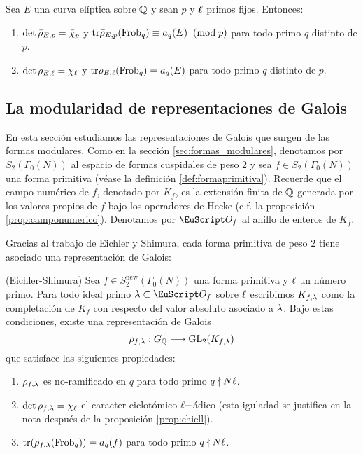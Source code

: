 \documentclass[../../tesis_maestria]{subfiles}
\begin{document}
\begin{cor}\label{cor:det_de_rhop}
  Sea $E$ una curva el\'iptica sobre $\mathbb{Q}$ y sean $p$ y $\ell$ primos fijos. Entonces:
  \begin{enumerate}
  \item $\det\bar{\rho}_{E,p}=\bar{\chi}_p$ y $\mathrm{tr}\bar{\rho}_{E,p}(\mathrm{Frob}_q)\equiv a_q(E)\;\;(\mathrm{mod}\; p)$ para todo primo $q$ distinto de $p$.
    \item $\det\rho_{E,\ell}=\chi_{\ell}$ y $\mathrm{tr}\rho_{E,\ell}(\mathrm{Frob}_q)=a_q(E)$ para todo primo $q$ distinto de $p$.
  \end{enumerate}
\end{cor}

\subsection{La modularidad de representaciones de Galois}%

En esta secci\'on estudiamos las representaciones de Galois que surgen de las formas modulares. Como en la secci\'on \ref{sec:formas_modulares}, denotamos por $S_2(\Gamma_0(N))$ al espacio de formas cuspidales de peso 2 y sea $f\in S_2(\Gamma_0(N))$ una forma primitiva (v\'ease la definici\'on \ref{def:formaprimitiva}). Recuerde que el campo num\'erico de $f$, denotado por $K_f$, es la extensi\'on finita de $\mathbb{Q}$ generada por los valores propios de $f$ bajo los operadores de Hecke (c.f. la proposici\'on \ref{prop:camponumerico}). Denotamos por $\Oo_f$ al anillo de enteros de $K_f$.

Gracias al trabajo de Eichler y Shimura, cada forma primitiva de peso 2 tiene asociado una representaci\'on de Galois:

\begin{thm}\label{thm:eichlershimura}(Eichler-Shimura)
  Sea $f\in S^{\mathrm{new}}_2(\Gamma_0(N))$ una forma primitiva y $\ell$ un n\'umero primo. Para   todo ideal primo $\la\subset\Oo_f$ sobre $\ell$ escribimos $K_{f,\lambda}$ como la completaci\'on de   $K_f$ con respecto del valor absoluto asociado a $\lambda$. Bajo estas condiciones, existe una representaci\'on de Galois
  \[
    \rho_{f,\lambda}:G_{\mathbb{Q}}\longrightarrow\mathrm{GL}_2(K_{f,\lambda})
  \]
  que satisface las siguientes propiedades:
  \begin{enumerate}[label=\roman*)]
  \item $\rho_{f,\lambda}$ es no-ramificado en $q$ para todo primo $q\nmid N\ell$.
  \item\label{es_uno} $\det\rho_{f,\lambda}=\chi_{\ell}$ el caracter ciclot\'omico $\ell-$\'adico (esta iguladad se justifica en la nota despu\'es de la proposici\'on \ref{prop:chiell}).
  \item $\mathrm{tr}(\rho_{f,\lambda}(\mathrm{Frob}_q))=a_q(f)$ para todo primo $q\nmid N\ell$.
  \end{enumerate}
\end{thm}
\end{document}
